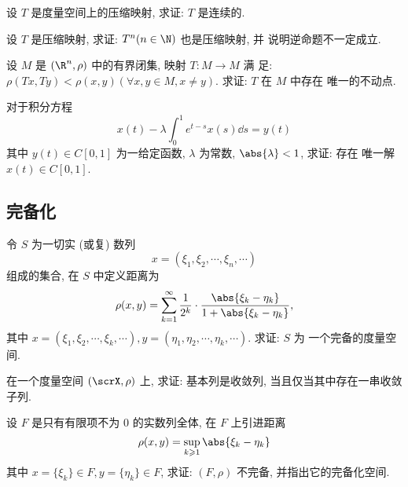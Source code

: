 \begin{exercise}
  设 $T$ 是度量空间上的压缩映射, 求证: $T$ 是连续的.
\end{exercise}

\begin{exercise}
  设 $T$ 是压缩映射, 求证: $T^{n}(n \in \N)$ 也是压缩映射, 并 说明逆命题不一定成立.
\end{exercise}

\begin{exercise}
  设 $M$ 是 $ ( \R^n, \rho ) $ 中的有界闭集, 映射 $T: M \rightarrow M$ 满 足: $\rho(T x, T y) < \rho(x, y)(\forall x, y \in M, x \neq y)$. 求证: $T$ 在 $M$ 中存在 唯一的不动点.
\end{exercise}

\begin{exercise}
  对于积分方程
    \[
      x(t) - \lambda \int_{0}^{1} e^{t - s} x(s) \dd{s} = y(t)
    \]
  其中 $y(t) \in C[0,1]$ 为一给定函数, $\lambda$ 为常数, $\abs{\lambda} < 1$, 求证: 存在 唯一解 $x(t) \in C[0,1]$.
\end{exercise}



\subsection{完备化}

\begin{exercise}[title = {空间 $S$}]
  令 $S$ 为一切实 (或复) 数列
    \[
      x = (\xi_{1}, \xi_{2}, \cdots, \xi_{n}, \cdots)
    \]
  组成的集合, 在 $S$ 中定义距离为 
    \[ 
      \rho(x, y) = \sum_{k = 1}^{\infty} \frac{1}{2^{k}} \cdot \frac{\abs{\xi_{k} - \eta_{k}}}{1 + \abs{\xi_{k}-\eta_{k}}}, 
    \] 
    其中 $x = (\xi_{1}, \xi_{2}, \cdots, \xi_{k}, \cdots), y = (\eta_{1}, \eta_{2}, \cdots, \eta_{k}, \cdots) .$ 求证: $S$ 为 一个完备的度量空间.
\end{exercise}

\begin{exercise}
  在一个度量空间 $(\scrX, \rho)$ 上, 求证: 基本列是收敛列, 当且仅当其中存在一串收敛子列.
\end{exercise}

\begin{exercise}
  设 $F$ 是只有有限项不为 $0$ 的实数列全体, 在 $F$ 上引进距离
  \[
    \rho(x, y)=\sup _{k \geqslant 1} \abs{\xi_{k}-\eta_{k}}
  \]
  其中 $x = \{\xi_{k}\} \in F, y = \{\eta_{k}\} \in F$, 求证: $(F, \rho)$ 不完备, 并指出它的完备化空间.
\end{exercise}

